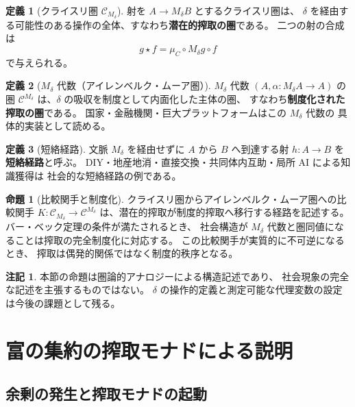 \documentclass[11pt,a4paper]{ltjsarticle}
\newcommand{\Mdelta}{M_\delta}
\theoremstyle{definition}
\newtheorem{definition}{定義}[section]
\newtheorem{proposition}{命題}[section]
\newtheorem{remark}{注記}[section]
\begin{document}
\begin{definition}[クライスリ圏 $\mathcal{C}_{\Mdelta}$]
射を $A \to \Mdelta B$ とするクライスリ圏は、
$\delta$ を経由する可能性のある操作の全体、すなわち\textbf{潜在的搾取の圏}である。
二つの射の合成は
\[
g \star f = \mu_C \circ \Mdelta g \circ f
\]
で与えられる。
\end{definition}

\begin{definition}[$\Mdelta$ 代数（アイレンベルク・ムーア圏）]
$\Mdelta$ 代数 $(A, \alpha: \Mdelta A \to A)$ の圏
$\mathcal{C}^{\Mdelta}$ は、$\delta$ の吸収を制度として内面化した主体の圏、
すなわち\textbf{制度化された搾取の圏}である。
国家・金融機関・巨大プラットフォームはこの $\Mdelta$ 代数の
具体的実装として読める。
\end{definition}

\begin{definition}[短絡経路]
文脈 $\Mdelta$ を経由せずに $A$ から $B$ へ到達する射 $h: A \to B$ を
\textbf{短絡経路}と呼ぶ。
DIY・地産地消・直接交換・共同体内互助・局所 AI による知識獲得は
社会的な短絡経路の例である。
\end{definition}

\begin{proposition}[比較関手と制度化]
クライスリ圏からアイレンベルク・ムーア圏への比較関手
$K: \mathcal{C}_{\Mdelta} \to \mathcal{C}^{\Mdelta}$
は、潜在的搾取が制度的搾取へ移行する経路を記述する。
バー・ベック定理の条件が満たされるとき、
社会構造が $\Mdelta$ 代数と圏同値になることは搾取の完全制度化に対応する。
この比較関手が実質的に不可逆になるとき、
搾取は偶発的関係ではなく制度的秩序となる。
\end{proposition}

\begin{remark}
本節の命題は圏論的アナロジーによる構造記述であり、
社会現象の完全な記述を主張するものではない。
$\delta$ の操作的定義と測定可能な代理変数の設定は今後の課題として残る。
\end{remark}

\section{富の集約の搾取モナドによる説明}

\subsection{余剰の発生と搾取モナドの起動}
\end{document}
